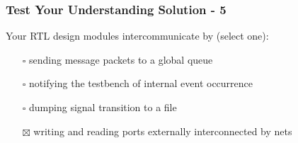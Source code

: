 \documentclass[t, notes]{beamer}
\begin{document}
\begin{frame}
\frametitle{Test Your Understanding Solution - 5}

Your RTL design modules intercommunicate by (select one):
\begin{itemize}
\item[$\square$] sending message packets to a global queue
\item[$\square$] notifying the testbench of internal event occurrence
\item[$\square$] dumping signal transition to a file
\item[$\boxtimes$] writing and reading ports externally interconnected by nets
\end{itemize}

\end{frame}
\end{document}
